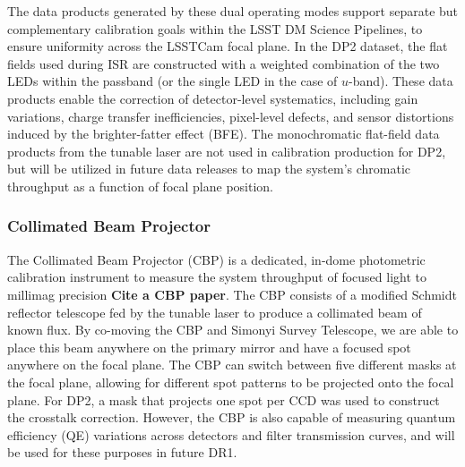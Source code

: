 The data products generated by these dual operating modes support separate but complementary calibration goals within the LSST DM Science Pipelines, to ensure uniformity across the LSSTCam focal plane. In the DP2 dataset, the flat fields used during ISR are constructed with a weighted combination of the two LEDs within the passband (or the single LED in the case of $u$-band). These data products enable the correction of detector-level systematics, including gain variations, charge transfer inefficiencies, pixel-level defects, and sensor distortions induced by the brighter-fatter effect (BFE). The monochromatic flat-field data products from the tunable laser are not used in calibration production for DP2, but will be utilized in future data releases to map the system's chromatic throughput as a function of focal plane position.

\subsubsection{Collimated Beam Projector}\label{sec:data:calsys:cbp}

The Collimated Beam Projector (CBP) is a dedicated, in-dome photometric calibration instrument to measure the system throughput of focused light to millimag precision \textbf{Cite a CBP paper}. The CBP consists of a modified Schmidt reflector telescope fed by the tunable laser to produce a collimated beam of known flux. By co-moving the CBP and Simonyi Survey Telescope, we are able to place this beam anywhere on the primary mirror and have a focused spot anywhere on the focal plane. The CBP can switch between five different masks at the focal plane, allowing for different spot patterns to be projected onto the focal plane. For DP2, a mask that projects one spot per CCD was used to construct the crosstalk correction. However, the CBP is also capable of measuring quantum efficiency (QE) variations across detectors and filter transmission curves, and will be used for these purposes in future DR1.



